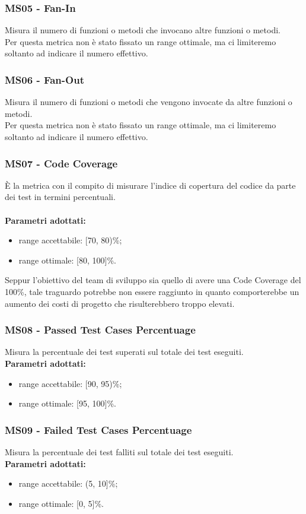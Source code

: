 \subsubsection{MS05 - Fan-In}
Misura il numero di funzioni o metodi che invocano altre funzioni o metodi.\\
Per questa metrica non  è stato fissato un range ottimale, ma ci limiteremo soltanto ad indicare il numero effettivo.

\subsubsection{MS06 - Fan-Out}
Misura il numero di funzioni o metodi che vengono invocate da altre funzioni o metodi.\\Per questa metrica non è stato fissato un range ottimale, ma ci limiteremo soltanto ad indicare il numero effettivo.

\subsubsection{MS07 - Code Coverage}
È la metrica con il compito di misurare l'indice di copertura del codice da parte dei test in termini percentuali.\\ \\ 
\textbf{Parametri adottati:} 
\begin{itemize}
\item range accettabile: [70, 80)\%;
\item range ottimale: [80, 100]\%.
\end{itemize}
Seppur l'obiettivo del team di sviluppo sia quello di avere una Code Coverage del 100\%, tale traguardo potrebbe non essere raggiunto in quanto comporterebbe un aumento dei costi di progetto che risulterebbero troppo elevati.
\subsubsection{MS08 - Passed Test Cases Percentuage}
Misura la percentuale dei test superati sul totale dei test eseguiti.\\
\textbf{Parametri adottati:} 
\begin{itemize}
\item range accettabile: [90, 95)\%;
\item range ottimale: [95, 100]\%.
\end{itemize}

\subsubsection{MS09 - Failed Test Cases Percentuage}
Misura la percentuale dei test falliti sul totale dei test eseguiti.\\
\textbf{Parametri adottati:} 
\begin{itemize}
\item range accettabile: (5, 10]\%;
\item range ottimale: [0, 5]\%.
\end{itemize}

